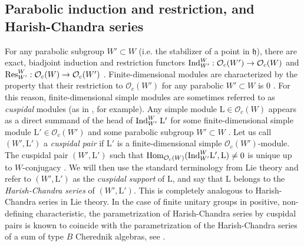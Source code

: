 \documentclass[12pt]{amsart}
\numberwithin{equation}{section}
\theoremstyle{definition}
\newcommand{\oh}{\mathcal{O}}
\newcommand{\el}{\mathrm{L}}
\begin{document}
\subsection{Parabolic induction and restriction, and Harish-Chandra series}
For any parabolic subgroup $W'\subset W$ (i.e. the stabilizer of a point in $\mathfrak{h}$), there are exact, biadjoint induction and restriction functors $\Ind_{W'}^W:\oh_c(W')\rightarrow\oh_c(W)$ and $\Res_{W'}^W:\oh_c(W)\rightarrow\oh_c(W')$ \cite{BezrukavnikovEtingof}. Finite-dimensional modules are characterized by the property that their restriction to $\oh_c(W')$ for any parabolic $W'\subset W$ is $0$ \cite{BezrukavnikovEtingof}. For this reason, finite-dimensional simple modules are sometimes referred to as \textit{cuspidal} modules (as in \cite[Section 5.7]{GGJL}, for example).  Any simple module $\el\in\oh_c(W)$ appears as a direct summand of the head of $\Ind_{W'}^W\;\el'$
for some finite-dimensional simple module $\el'\in\oh_c(W')$ and some parabolic subgroup $W'\subset W$ \cite{BezrukavnikovEtingof}. Let us call $(W',\el')$ a \textit{cuspidal pair} if $\el'$ is a finite-dimensional simple $\oh_c(W')$-module. The cuspidal pair $(W',\el')$ such that $\Hom_{\oh_c(W)}(\Ind_{W'}^W\el',\el)\neq 0$ is unique up to $W$-conjugacy \cite{LosevSA}. We will then use the standard terminology from Lie theory and refer to $(W',\el')$ as the \textit{cuspidal support} of $\el$, and say that $\el$ belongs to the \textit{Harish-Chandra series} of $(W',\el')$. This is completely analogous to Harish-Chandra series in Lie theory. In the case of finite unitary groups in positive, non-defining characteristic, the parametrization of Harish-Chandra series by cuspidal pairs is known to coincide with the parametrization of the Harish-Chandra series of a sum of type $B$ Cherednik algebras, see \cite{DVV2}.
\end{document}
